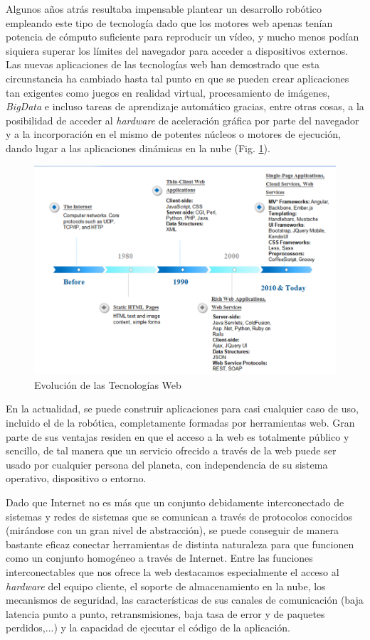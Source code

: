Algunos años atrás resultaba impensable plantear un desarrollo robótico empleando este tipo de tecnología dado que los motores web apenas tenían potencia de cómputo suficiente para reproducir un vídeo, y mucho menos podían siquiera superar los límites del navegador para acceder a dispositivos externos. Las nuevas aplicaciones de las tecnologías web han demostrado que esta circunstancia ha cambiado hasta tal punto en que se pueden crear aplicaciones tan exigentes como juegos en realidad virtual, procesamiento de imágenes, \textit{BigData} e incluso tareas de aprendizaje automático gracias, entre otras cosas, a la posibilidad de acceder al \textit{hardware} de aceleración gráfica por parte del navegador y a la incorporación en el mismo de potentes núcleos o motores de ejecución, dando lugar a las aplicaciones dinámicas en la nube (Fig. \ref{web}).

\begin{figure}[!hbtp]  \centering\noindent
    \includegraphics[width=\textwidth]{figures/web-history.png}
    \caption{Evolución de las Tecnologías Web}
    \label{web}
\end{figure}

En la actualidad, se puede construir aplicaciones para casi cualquier caso de uso, incluido el de la robótica, completamente formadas por herramientas web. Gran parte de sus ventajas residen en que el acceso a la web es totalmente público y sencillo, de tal manera que un servicio ofrecido a través de la web puede ser usado por cualquier persona del planeta, con independencia de su sistema operativo, dispositivo o entorno. 

Dado que Internet no es más que un conjunto debidamente interconectado de sistemas y redes de sistemas que se comunican a través de protocolos conocidos (mirándose con un gran nivel de abstracción), se puede conseguir de manera bastante eficaz conectar herramientas de distinta naturaleza para que funcionen como un conjunto homogéneo a través de Internet. Entre las funciones interconectables que nos ofrece la web destacamos especialmente el acceso al \textit{hardware} del equipo cliente, el soporte de almacenamiento en la nube, los mecanismos de seguridad, las características de sus canales de comunicación (baja latencia punto a punto, retransmisiones, baja tasa de error y de paquetes perdidos,...) y la capacidad de ejecutar el código de la aplicación. 

